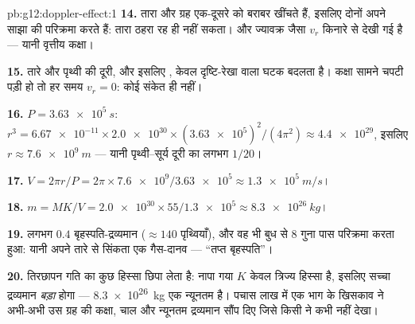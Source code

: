 \begin{solution}{pb:g12:doppler-effect:1}
\textbf{14.} तारा और ग्रह एक-दूसरे को बराबर खींचते हैं, इसलिए दोनों अपने साझा
 की परिक्रमा करते हैं: तारा ठहरा रह ही नहीं
सकता। और ज्यावक्र जैसा $v_r$ किनारे से देखी गई 
है --- यानी वृत्तीय कक्षा।

\textbf{15.} तारे और पृथ्वी की दूरी, और इसलिए , केवल
दृष्टि-रेखा वाला घटक बदलता है। कक्षा सामने चपटी पड़ी हो तो हर समय $v_r = 0$:
कोई संकेत ही नहीं।

\textbf{16.} $P = \qty{3.63e5}{s}$: $r^3 = \num{6.67e-11} \times \num{2.0e30} \times
(\num{3.63e5})^2/(4\pi^2) \approx \num{4.4e29}$, इसलिए $r \approx \qty{7.6e9}{m}$ --- यानी पृथ्वी--सूर्य दूरी का
लगभग $1/20$।

\textbf{17.} $V = 2\pi r/P = 2\pi \times \num{7.6e9}/\num{3.63e5} \approx
\qty{1.3e5}{m/s}$।

\textbf{18.} $m = M K/V = \num{2.0e30} \times 55/\num{1.3e5} \approx \qty{8.3e26}{kg}$।

\textbf{19.} लगभग $0.4$ बृहस्पति-द्रव्यमान ($\approx 140$ पृथ्वियाँ), और वह भी
बुध से $8$ गुना पास परिक्रमा करता हुआ: यानी अपने तारे से सिंकता एक गैस-दानव
--- ``तप्त बृहस्पति''।

\textbf{20.} तिरछापन गति का कुछ हिस्सा छिपा लेता है: नापा गया $K$ केवल
त्रिज्य हिस्सा है, इसलिए सच्चा द्रव्यमान \emph{बड़ा} होगा --- \qty{8.3e26}{kg} एक
न्यूनतम है। पचास लाख में एक भाग के  खिसकाव ने अभी-अभी उस ग्रह
की कक्षा, चाल और न्यूनतम द्रव्यमान सौंप दिए जिसे किसी ने कभी नहीं
देखा।
\end{solution}
